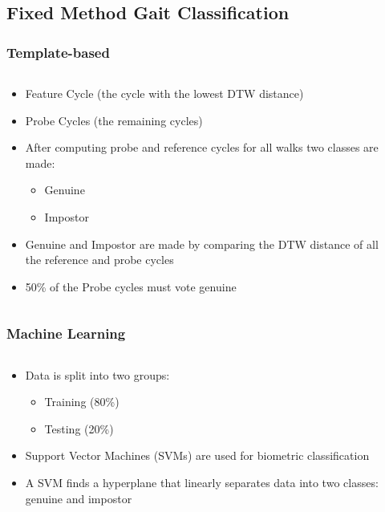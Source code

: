 \documentclass{beamer}
\begin{document}
\subsection{Fixed Method Gait Classification}
\begin{frame}
\frametitle{Template-based}
 \begin{columns}
  \begin{column}{.8\textwidth}
  \begin{itemize}
		\item Feature Cycle (the cycle with the lowest DTW distance)
		\linebreak
		\item Probe Cycles (the remaining cycles)
		\linebreak
		\item After computing probe and reference cycles for all walks two classes are made:
			\begin{itemize}
			\item Genuine
			\item Impostor
			\linebreak
			\end{itemize}
		
		\item Genuine and Impostor are made by comparing the DTW distance of all the reference and probe cycles					
		\linebreak
		\item 50\% of the Probe cycles must vote genuine		
  \end{itemize}
  \end{column}
  \begin{column}{0.7\textwidth}
       \\
  \end{column}
  \end{columns}  
\end{frame}

\begin{frame}
\frametitle{Machine Learning}
 \begin{columns}
  \begin{column}{.8\textwidth}
  \begin{itemize}
  		\item Data is split into two groups:
  			\begin{itemize}
  				\item Training (80\%)
  				\item Testing (20\%)
  			\end{itemize}
		\item Support Vector Machines (SVMs) are used for biometric classification
		\item A SVM finds a hyperplane that linearly separates data into two classes: genuine and impostor
  \end{itemize}
  \end{column}
  \begin{column}{0.7\textwidth}
       \\
  \end{column}
  \end{columns}  
\end{frame}
\end{document}
